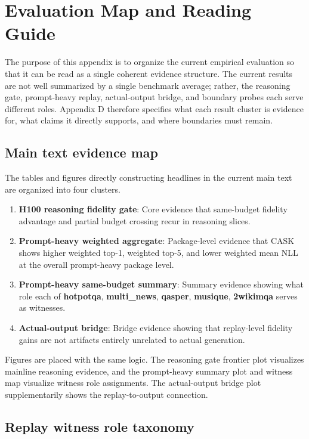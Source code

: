 \section{Evaluation Map and Reading Guide}


The purpose of this appendix is to organize the current empirical evaluation so that it can be read as a single coherent evidence structure. The current results are not well summarized by a single benchmark average; rather, the reasoning gate, prompt-heavy replay, actual-output bridge, and boundary probes each serve different roles. Appendix D therefore specifies what each result cluster is evidence for, what claims it directly supports, and where boundaries must remain.


\subsection{Main text evidence map}


The tables and figures directly constructing headlines in the current main text are organized into four clusters.


\begin{enumerate}
\item \textbf{H100 reasoning fidelity gate}: Core evidence that same-budget fidelity advantage and partial budget crossing recur in reasoning slices.
\item \textbf{Prompt-heavy weighted aggregate}: Package-level evidence that CASK shows higher weighted top-1, weighted top-5, and lower weighted mean NLL at the overall prompt-heavy package level.
\item \textbf{Prompt-heavy same-budget summary}: Summary evidence showing what role each of \textbf{hotpotqa}, \textbf{multi\_news}, \textbf{qasper}, \textbf{musique}, \textbf{2wikimqa} serves as witnesses.
\item \textbf{Actual-output bridge}: Bridge evidence showing that replay-level fidelity gains are not artifacts entirely unrelated to actual generation.
\end{enumerate}


Figures are placed with the same logic. The reasoning gate frontier plot visualizes mainline reasoning evidence, and the prompt-heavy summary plot and witness map visualize witness role assignments. The actual-output bridge plot supplementarily shows the replay-to-output connection.


\subsection{Replay witness role taxonomy}


